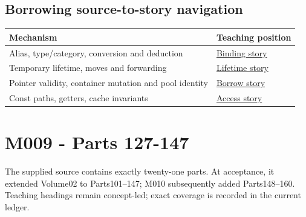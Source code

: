\subsection{Borrowing source-to-story navigation}\label{appendix-fd090d982a15-borrowing-source-to-story-navigation}

{\def\LTcaptype{none} %
\begin{longtable}[]{@{}
  >{\raggedright\arraybackslash}p{}
  >{\raggedright\arraybackslash}p{}@{}}
\toprule\noalign{}
\begin{minipage}[b]{\linewidth}\raggedright
Mechanism
\end{minipage} & \begin{minipage}[b]{\linewidth}\raggedright
Teaching position
\end{minipage} \\
\midrule\noalign{}
\endhead
\bottomrule\noalign{}
\endlastfoot
Alias, type/category, conversion and deduction & \href{Continuous\%20Notes/Computing\%20Foundations\%20-\%20From\%20Bits\%20to\%20C++\%20and\%20Systems\%20APIs\#Giving\%20another\%20name\%20to\%20a\%20live\%20object/}{Binding story} \\
Temporary lifetime, moves and forwarding & \href{Continuous\%20Notes/Computing\%20Foundations\%20-\%20From\%20Bits\%20to\%20C++\%20and\%20Systems\%20APIs\#A\%20temporary\%20needs\%20an\%20explicit\%20lifetime\%20story/}{Lifetime story} \\
Pointer validity, container mutation and pool identity & \href{Continuous\%20Notes/Computing\%20Foundations\%20-\%20From\%20Bits\%20to\%20C++\%20and\%20Systems\%20APIs\#When\%20a\%20valid\%20borrow\%20stops\%20naming\%20the\%20intended\%20thing/}{Borrow story} \\
Const paths, getters, cache invariants & \href{Continuous\%20Notes/Computing\%20Foundations\%20-\%20From\%20Bits\%20to\%20C++\%20and\%20Systems\%20APIs\#Read-only\%20is\%20a\%20path,\%20not\%20an\%20ownership\%20or\%20synchronization\%20promise/}{Access story} \\
\end{longtable}
}

\section{M009 - Parts 127-147}\label{appendix-fd090d982a15-m009---parts-127-147}

The supplied source contains exactly twenty-one parts. At acceptance, it extended Volume02 to Parts101--147; M010 subsequently added Parts148--160. Teaching headings remain concept-led; exact coverage is recorded in the current ledger.

